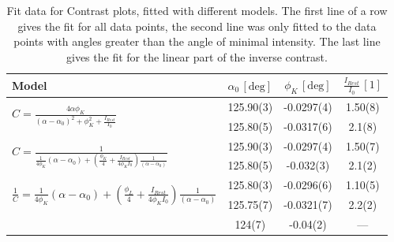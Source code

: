 \documentclass[a4paper,10pt]{scrartcl}
\begin{document}
\begin{table}
\begin{center}
\begin{tabular}{lccc}
\toprule
Model                                                                                                                                                           & $\alpha_{0}\,[\mbox{deg}]$ & $\phi_{K}\,[\mbox{deg}]$ & $\tfrac{I_{Rest}}{I_{0}}\,[1]$ \\
\midrule
\multirow{2}{*}{$C = \frac{4 \alpha \phi_{K}}{(\alpha - \alpha_{0})^2 + \phi^{2}_{K} + \frac{I_{Rest}}{I_{0}}}$}                                                            & 125.90(3) & -0.0297(4) & 1.50(8) \\
                                                                                                                                                                            & 125.80(5) & -0.0317(6) & 2.1(8)\phantom{0}  \\ 
\multirow{2}{*}{$C = \frac{1}{\frac{1}{4 \phi_K} (\alpha - \alpha_{0}) + \left(\frac{\phi_K}{4} + \frac{I_{Rest}}{4 \phi_K I_0}\right)\frac{1}{(\alpha - \alpha_{0})}}$}    & 125.90(3) & -0.0297(4) & 1.50(7) \\
                                                                                                                                                                            & 125.80(5) & -0.032(3)\phantom{0}  & 2.1(2)\phantom{0}  \\
\multirow{2}{*}{$\frac{1}{C} = \frac{1}{4 \phi_K} (\alpha - \alpha_{0}) + \left( \frac{\phi_L}{4} + \frac{I_{Rest}}{4 \phi_K I_0} \right) \frac{1}{(\alpha - \alpha_{0})}$} & 125.80(3) & -0.0296(6) & 1.10(5) \\
                                                                                                                                                                            & 125.75(7) & -0.0321(7) & 2.2(2)\phantom{0}  \\
                                                                                                                                                                            & 124(7)    & -0.04(2)\phantom{00}   & ---     \\
\bottomrule
\end{tabular}
\end{center}
\par
\caption{Fit data for Contrast plots, fitted with different models. The first line of a row gives the fit for all data points, the second line was only fitted to the data points with angles greater than the angle of minimal intensity. The last line gives the fit for the linear part of the inverse contrast. \label{tab:a2fits}}
\end{table}
\end{document}
